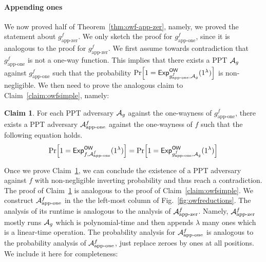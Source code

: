 \documentclass[a4paper,table,dvipsnames]{article}
\theoremstyle{definition}
\newtheorem{claim}{Claim}
\begin{document}
\paragraph{Appending ones} We now proved half of Theorem~\ref{thm:owf-app-zer}, namely, we proved the statement about $g^f_{\text{app-zer}}$.
We only sketch the proof for $g^f_{\text{app-one}}$, since it is analogous to the proof for $g^f_{\text{app-zer}}$. We first assume towards contradiction that $g^f_{\text{app-one}}$ is not a one-way function. This implies that there exists a PPT $\mathcal{A}_g$ against $g^f_{\text{app-one}}$ such that the probability $\prob{1={\mathsf{Exp}}_{g^f_{\text{app-one}},\adv_g}^{\mathsf{OW}}(1^\lambda)}$ is non-negligible.
We then need to prove the analogous claim to Claim~\ref{claim:owfsimple}, namely:
\begin{claim}\label{claim:owfsimple1}
For each PPT adversary $\mathcal{A}_g$ against the one-wayness of $g^f_{\text{app-one}}$, there exists a PPT adversary $\mathcal{A}^f_{\text{app-one}}$ against the one-wayness of $f$ such that the following equation holds.
\begin{equation}\label{eq:reductionowfones}
\prob{1={\mathsf{Exp}}_{f,\adv^f_{\text{app-one}}}^{\mathsf{OW}}(1^\lambda)}=\prob{1={\mathsf{Exp}}_{g^f_{\text{app-one}},\adv_g}^{\mathsf{OW}}(1^\lambda)}
\end{equation}
\end{claim}
Once we prove Claim~\ref{claim:owfsimple1}, we can conclude the existence of a PPT adversary against $f$ with non-negligible inverting probability and thus reach a contradiction. The proof of Claim~\ref{claim:owfsimple1} is analogous to the proof of Claim~\ref{claim:owfsimple}. We construct $\mathcal{A}^f_{\text{app-one}}$ in the the left-most column of Fig.~\ref{fig:owfreductions}. The analysis of its runtime is analogous to the analysis of $\mathcal{A}^f_{\text{app-zer}}$. Namely, $\mathcal{A}^f_{\text{app-zer}}$ mostly runs $\mathcal{A}_g$ which is polynomial-time and then
appends $\lambda$ many ones which is a linear-time operation. The probability analysis for $\mathcal{A}^f_{\text{app-one}}$ is analogous to
the probability analysis of $\mathcal{A}^f_{\text{app-one}}$, just replace zeroes by ones at all positions. We include it here for completeness:
\end{document}
